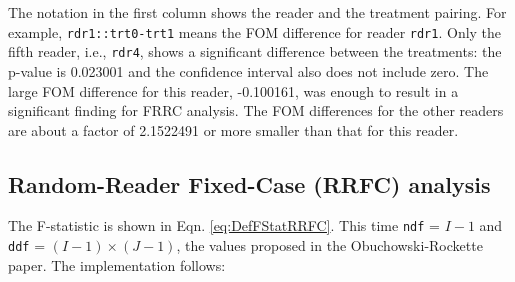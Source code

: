 \documentclass[
]{book}
\newenvironment{Shaded}{\begin{snugshade}}{\end{snugshade}}
\newcommand{\CommentTok}[1]{\textcolor[rgb]{0.56,0.35,0.01}{\textit{#1}}}
\newcommand{\DataTypeTok}[1]{\textcolor[rgb]{0.13,0.29,0.53}{#1}}
\newcommand{\DecValTok}[1]{\textcolor[rgb]{0.00,0.00,0.81}{#1}}
\newcommand{\KeywordTok}[1]{\textcolor[rgb]{0.13,0.29,0.53}{\textbf{#1}}}
\newcommand{\NormalTok}[1]{#1}
\newcommand{\OperatorTok}[1]{\textcolor[rgb]{0.81,0.36,0.00}{\textbf{#1}}}
\newcommand{\OtherTok}[1]{\textcolor[rgb]{0.56,0.35,0.01}{#1}}
\newcommand{\StringTok}[1]{\textcolor[rgb]{0.31,0.60,0.02}{#1}}
\begin{document}
The notation in the first column shows the reader and the treatment pairing. For example, \texttt{rdr1::trt0-trt1} means the FOM difference for reader \texttt{rdr1}. Only the fifth reader, i.e., \texttt{rdr4}, shows a significant difference between the treatments: the p-value is 0.023001 and the confidence interval also does not include zero. The large FOM difference for this reader, -0.100161, was enough to result in a significant finding for FRRC analysis. The FOM differences for the other readers are about a factor of 2.1522491 or more smaller than that for this reader.

\hypertarget{ORApplications-RRFC-dataset02-hand}{%
\subsection{Random-Reader Fixed-Case (RRFC) analysis}\label{ORApplications-RRFC-dataset02-hand}}

The F-statistic is shown in Eqn. \eqref{eq:DefFStatRRFC}. This time \texttt{ndf} = \(I-1\) and \texttt{ddf} = \((I-1) \times (J-1)\), the values proposed in the Obuchowski-Rockette paper. The implementation follows:

\begin{Shaded}
\end{Shaded}
\end{document}
